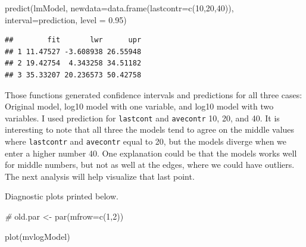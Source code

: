 \documentclass[
]{article}
\newenvironment{Shaded}{\begin{snugshade}}{\end{snugshade}}
\newcommand{\AttributeTok}[1]{\textcolor[rgb]{0.77,0.63,0.00}{#1}}
\newcommand{\CommentTok}[1]{\textcolor[rgb]{0.56,0.35,0.01}{\textit{#1}}}
\newcommand{\DecValTok}[1]{\textcolor[rgb]{0.00,0.00,0.81}{#1}}
\newcommand{\FloatTok}[1]{\textcolor[rgb]{0.00,0.00,0.81}{#1}}
\newcommand{\FunctionTok}[1]{\textcolor[rgb]{0.00,0.00,0.00}{#1}}
\newcommand{\NormalTok}[1]{#1}
\newcommand{\OtherTok}[1]{\textcolor[rgb]{0.56,0.35,0.01}{#1}}
\newcommand{\StringTok}[1]{\textcolor[rgb]{0.31,0.60,0.02}{#1}}
\begin{document}
\begin{Shaded}
\begin{Highlighting}[]
\FunctionTok{predict}\NormalTok{(lmModel,}
        \AttributeTok{newdata=}\FunctionTok{data.frame}\NormalTok{(}\AttributeTok{lastcontr=}\FunctionTok{c}\NormalTok{(}\DecValTok{10}\NormalTok{,}\DecValTok{20}\NormalTok{,}\DecValTok{40}\NormalTok{)),}
        \AttributeTok{interval=}\StringTok{\textquotesingle{}prediction\textquotesingle{}}\NormalTok{,}
        \AttributeTok{level =} \FloatTok{0.95}\NormalTok{)}
\end{Highlighting}
\end{Shaded}

\begin{verbatim}
##        fit       lwr      upr
## 1 11.47527 -3.608938 26.55948
## 2 19.42754  4.343258 34.51182
## 3 35.33207 20.236573 50.42758
\end{verbatim}

Those functions generated confidence intervals and predictions for all
three cases: Original model, log10 model with one variable, and log10
model with two variables. I used prediction for \texttt{lastcont} and
\texttt{avecontr} 10, 20, and 40. It is interesting to note that all
three the models tend to agree on the middle values where
\texttt{lastcontr} and \texttt{avecontr} equal to 20, but the models
diverge when we enter a higher number 40. One explanation could be that
the models works well for middle numbers, but not as well at the edges,
where we could have outliers. The next analysis will help visualize that
last point.

Diagnostic plots printed below.

\begin{Shaded}
\begin{Highlighting}[]
\CommentTok{\# }
\NormalTok{old.par }\OtherTok{\textless{}{-}} \FunctionTok{par}\NormalTok{(}\AttributeTok{mfrow=}\FunctionTok{c}\NormalTok{(}\DecValTok{1}\NormalTok{,}\DecValTok{2}\NormalTok{))}

\FunctionTok{plot}\NormalTok{(mvlogModel)}
\end{Highlighting}
\end{Shaded}
\end{document}
